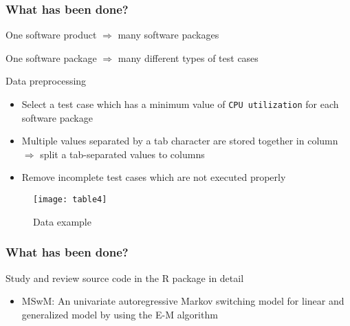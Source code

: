 \documentclass{beamer}
\begin{document}
\begin{frame}
\frametitle{What has been done?}
One software product $\Rightarrow$ many software packages
	
One software package $\Rightarrow$ many different types of test cases

\vspace{3mm}

Data preprocessing 

\begin{itemize}
	\item Select a test case which has a minimum value of \texttt{CPU utilization} for each software package
	\item Multiple values separated by a tab character are stored together in column $\Rightarrow$ split a tab-separated values to columns
	\item Remove incomplete test cases which are not executed properly 
	
\end{itemize}
	
\begin{figure}
	\texttt{[image: table4]}
	\caption{Data example}
\end{figure}

\end{frame}


\begin{frame}
\frametitle{What has been done?}
\begin{large}
	Study and review source code  in the R package in detail
	\begin{itemize}
		\item MSwM: An univariate autoregressive Markov switching model for linear and generalized model by using the E-M algorithm \cite{p3}
	\end{itemize}
\end{large}

\end{frame}
\end{document}
